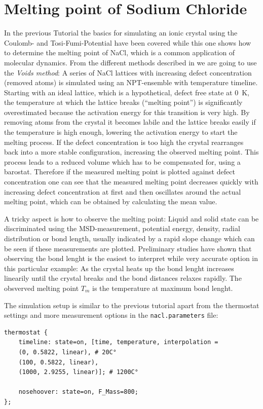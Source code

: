 \section{Melting point of Sodium Chloride}
In the previous Tutorial the basics for simulating an ionic crystal
using the Coulomb- and Tosi-Fumi-Potential have been covered while this
one shows how to determine the melting point of NaCl, which is a common
application of molecular dynamics. From the different methods described
in \cite{nacl_melting} we are going to use the \emph{Voids method}: A
series of NaCl lattices with increasing defect concentration (removed
atoms) is simulated using an NPT-ensemble with temperature timeline.
Starting with an ideal lattice, which is a hypothetical, defect free
state at \SI{0}{\kelvin}, the temperature at which the lattice breaks
(``melting point'') is significantly overestimated because the
activation energy for this transition is very high. By removing atoms
from the crystal it becomes labile and the lattice breaks easily if the
temperature is high enough, lowering the activation energy to start the
melting process. If the defect concentration is too high the crystal
rearranges back into a more stable configuration, increasing the
observed melting point. This process leads to a reduced volume which has
to be compensated for, using a barostat. Therefore if the measured melting point is
plotted against defect concentration one can see that the measured melting point
decreases quickly with increasing defect concentration at first and then
oscillates around the actual melting point, which can be obtained by
calculating the mean value.

A tricky aspect is how to observe the melting point: Liquid and solid
state can be discriminated using the MSD-measurement, potential energy,
density, radial distribution or bond length, usually indicated by a rapid
slope change which can be seen if these measurements are plotted.
Preliminary studies have shown that observing the bond lenght is the
easiest to interpret while very accurate option in this particular
example: As the crystal heats up the bond lenght increases linearily
until the crystal breaks and the bond distances relaxes rapidly. The
obsverved melting point $T_m$ is the temperature at maximum bond lenght.

The simulation setup is similar to the previous tutorial apart from the
thermostat settings and more measurement options in the
\texttt{nacl.parameters} file:

\begin{lstlisting}[extendedchars=\true, inputencoding=utf8x]
thermostat {
    timeline: state=on, [time, temperature, interpolation =
    (0, 0.5822, linear), # 20C°
    (100, 0.5822, linear),
    (1000, 2.9255, linear)]; # 1200C°

    nosehoover: state=on, F_Mass=800;
};
\end{lstlisting}

